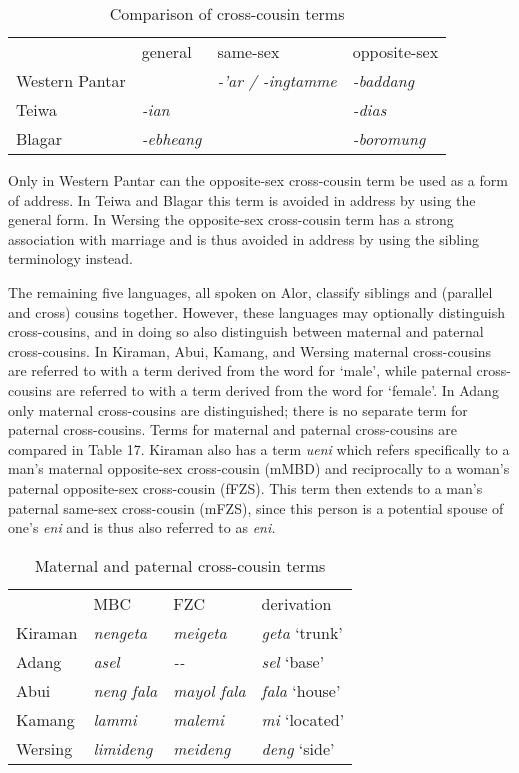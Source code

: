 \begin{table}
\begin{tabular}{llll} & general & same-sex & opposite-sex\\
Western Pantar &  & \textit{{}-'ar / -ingtamme} & \textit{{}-baddang}\\
Teiwa & \textit{{}-ian} &  & \textit{{}-dias}\\
Blagar & \textit{{}-ebheang} &  & \textit{{}-boromung}\\
\end{tabular}

\caption{Comparison of cross-cousin terms}
\end{table}

Only in Western Pantar can the opposite-sex cross-cousin term be used as a form of address. In Teiwa and Blagar this term is avoided in address by using the general form. In Wersing the opposite-sex cross-cousin term has a strong association with marriage and is thus avoided in address by using the sibling terminology instead.

  The remaining five languages, all spoken on Alor, classify siblings and (parallel and cross) cousins together. However, these languages may optionally distinguish cross-cousins, and in doing so also distinguish between maternal and paternal cross-cousins. In Kiraman, Abui, Kamang, and Wersing maternal cross-cousins are referred to with a term derived from the word for `male', while paternal cross-cousins are referred to with a term derived from the word for `female'. In Adang only maternal cross-cousins are distinguished; there is no separate term for paternal cross-cousins. Terms for maternal and paternal cross-cousins are compared in Table 17. Kiraman also has a term \textit{ueni} which refers specifically to a man's maternal opposite-sex cross-cousin (mMBD) and reciprocally to a woman's paternal opposite-sex cross-cousin (fFZS). This term then extends to a man's paternal same-sex cross-cousin (mFZS), since this person is a potential spouse of one's \textit{eni} and is thus also referred to as \textit{eni.}



\begin{table}
\begin{tabular}{llll} & MBC & FZC & derivation\\
Kiraman & \textit{nengeta} & \textit{meigeta} & \textit{geta} `trunk'\\
Adang & \textit{asel} & \textit{{}-{}-} & \textit{sel} `base'\\
Abui & \textit{neng fala} & \textit{mayol fala} & \textit{fala} `house'\\
Kamang & \textit{lammi} & \textit{malemi} & \textit{mi} `located'\\
Wersing & \textit{limideng} & \textit{meideng} & \textit{deng} `side'\\
\end{tabular}

\caption{Maternal and paternal cross-cousin terms}
\end{table}

